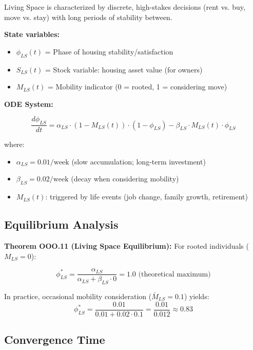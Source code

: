 Living Space is characterized by discrete, high-stakes decisions (rent vs. buy, move vs. stay)
with long periods of stability between.

\textbf{State variables:}
\begin{itemize}[nosep]
\item $\phi_{LS}(t)$ = Phase of housing stability/satisfaction
\item $S_{LS}(t)$ = Stock variable: housing asset value (for owners)
\item $M_{LS}(t)$ = Mobility indicator (0 = rooted, 1 = considering move)
\end{itemize}

\textbf{ODE System:}

\begin{equation}
\frac{d\phi_{LS}}{dt} = \alpha_{LS} \cdot (1 - M_{LS}(t)) \cdot (1 - \phi_{LS}) - \beta_{LS} \cdot M_{LS}(t) \cdot \phi_{LS}
\label{eq:ls-phase}
\end{equation}

where:
\begin{itemize}[nosep]
\item $\alpha_{LS} = 0.01 / \text{week}$ (slow accumulation; long-term investment)
\item $\beta_{LS} = 0.02 / \text{week}$ (decay when considering mobility)
\item $M_{LS}(t)$: triggered by life events (job change, family growth, retirement)
\end{itemize}

\subsection{Equilibrium Analysis}

\textbf{Theorem OOO.11 (Living Space Equilibrium):} For rooted individuals ($M_{LS} = 0$):

\begin{equation}
\phi^*_{LS} = \frac{\alpha_{LS}}{\alpha_{LS} + \beta_{LS} \cdot 0} = 1.0 \text{ (theoretical maximum)}
\end{equation}

In practice, occasional mobility consideration ($\bar{M}_{LS} = 0.1$) yields:
\begin{equation}
\phi^*_{LS} = \frac{0.01}{0.01 + 0.02 \cdot 0.1} = \frac{0.01}{0.012} \approx 0.83
\end{equation}

\subsection{Convergence Time}

